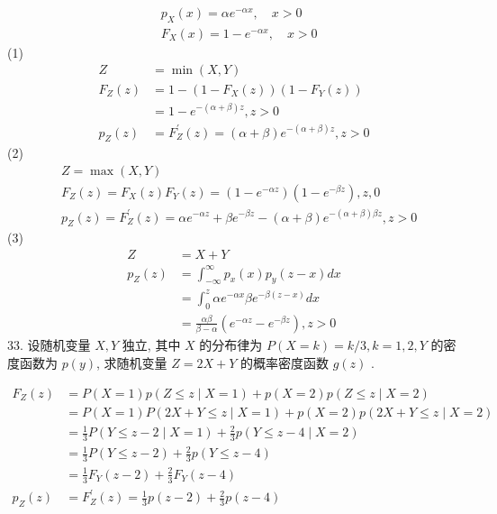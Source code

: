 \documentclass[14pt]{scrartcl} %
\numberwithin{equation}{section} %
\numberwithin{figure}{section} %
\numberwithin{table}{section} %
\begin{document}
\[
\begin{aligned}
	& p_X(x)=\alpha e^{-\alpha x}, \quad x>0 \\
	& F_X(x)=1-e^{-\alpha x}, \quad x>0
\end{aligned}
\]
(1)
\[
\begin{aligned}
	Z&=\min (X, Y) \\
	F_Z(z)&=1 -  \left(1-F_X(z)\right)\left(1-F_Y(z)\right) \\
	& =1-e^{-(\alpha+\beta) z}, z>0 \\
	p_Z(z)&=F_Z^{\prime}(z)=(\alpha+\beta) e^{-(\alpha+\beta) z}, z>0
\end{aligned}
\]
(2)
\[
\begin{aligned}
	& Z=\max (X, Y) \\
	& F_Z(z)=F_X(z) F_Y(z)=\left(1-e^{-\alpha z}\right)\left(1-e^{-\beta z}\right), z, 0 \\
	& p_Z(z)=F_Z^{\prime}(z)=\alpha e^{-\alpha z}+\beta e^{-\beta z}-(\alpha+\beta) e^{-(\alpha + \beta) \beta z}, z>0
\end{aligned}
\]
(3)
\[
\begin{aligned}
	Z& =X+Y\\
	p_Z(z) & =\int_{-\infty}^{\infty} p_x(x) p_y(z-x) d x \\
	& =\int_0^z \alpha e^{-\alpha x} \beta e^{-\beta(z-x)} d x \\
	& =\frac{\alpha \beta}{\beta-\alpha}\left(e^{-\alpha z}-e^{-\beta z}\right), z>0
\end{aligned}
\]
33. 设随机变量 $X, Y$ 独立, 其中 $X$ 的分布律为 $P(X=k)=k / 3, k=1,2, Y$ 的密度函数为 $p(y)$, 求随机变量 $Z=2 X+Y$ 的概率密度函数 $g(z)$ .

\[
\begin{aligned}
	F_Z(z) & =P(X=1) p(Z\leq z \mid X=1)+p(X=2) p(Z \leq z \mid X=2) \\
	& =P(X=1) P(2 X+Y \leq z \mid X=1)+p(X=2) p(2X+Y \leq z \mid X=2) \\
	& =\frac{1}{3} P(Y \leq z-2 \mid X=1)+\frac{2}{3} p(Y \leq z-4 \mid X=2) \\
	& =\frac{1}{3} P(Y \leq z-2)+\frac{2}{3} p(Y \leq z-4) \\
	& =\frac{1}{3} F_Y(z-2)+\frac{2}{3} F_Y(z-4) \\
	p_Z(z) & =F_Z^{\prime}(z)=\frac{1}{3} p(z-2)+\frac{2}{3} p(z-4)
\end{aligned}
\]
	
	
\end{document}
